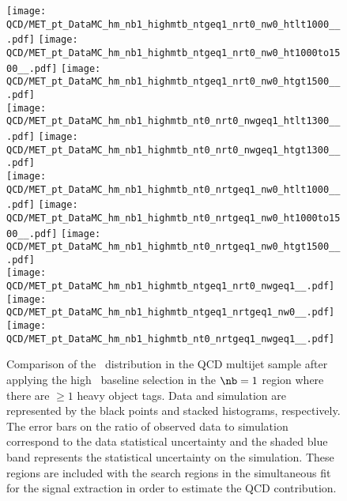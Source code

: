 \begin{figure}[!htb]
	\begin{center}
  \texttt{[image: QCD/MET\_pt\_DataMC\_hm\_nb1\_highmtb\_ntgeq1\_nrt0\_nw0\_htlt1000\_\_.pdf]}
  \texttt{[image: QCD/MET\_pt\_DataMC\_hm\_nb1\_highmtb\_ntgeq1\_nrt0\_nw0\_ht1000to1500\_\_.pdf]}
  \texttt{[image: QCD/MET\_pt\_DataMC\_hm\_nb1\_highmtb\_ntgeq1\_nrt0\_nw0\_htgt1500\_\_.pdf]} \\
  \texttt{[image: QCD/MET\_pt\_DataMC\_hm\_nb1\_highmtb\_nt0\_nrt0\_nwgeq1\_htlt1300\_\_.pdf]} 
  \texttt{[image: QCD/MET\_pt\_DataMC\_hm\_nb1\_highmtb\_nt0\_nrt0\_nwgeq1\_htgt1300\_\_.pdf]} \\
  \texttt{[image: QCD/MET\_pt\_DataMC\_hm\_nb1\_highmtb\_nt0\_nrtgeq1\_nw0\_htlt1000\_\_.pdf]} 
  \texttt{[image: QCD/MET\_pt\_DataMC\_hm\_nb1\_highmtb\_nt0\_nrtgeq1\_nw0\_ht1000to1500\_\_.pdf]} 
  \texttt{[image: QCD/MET\_pt\_DataMC\_hm\_nb1\_highmtb\_nt0\_nrtgeq1\_nw0\_htgt1500\_\_.pdf]} \\
  \texttt{[image: QCD/MET\_pt\_DataMC\_hm\_nb1\_highmtb\_ntgeq1\_nrt0\_nwgeq1\_\_.pdf]} 
  \texttt{[image: QCD/MET\_pt\_DataMC\_hm\_nb1\_highmtb\_ntgeq1\_nrtgeq1\_nw0\_\_.pdf]} 
  \texttt{[image: QCD/MET\_pt\_DataMC\_hm\_nb1\_highmtb\_nt0\_nrtgeq1\_nwgeq1\_\_.pdf]} \\
	\end{center}
	\caption[QCD Multijet HM Control Region $\nb=1$]{Comparison of the \met~distribution in the QCD multijet sample after applying the high \dm~baseline selection in the $\nb=1$ region where there are $\geq1$ heavy object tags. Data and simulation are represented by the black points and stacked histograms, respectively. The error bars on the ratio of observed data to simulation correspond to the data statistical uncertainty and the shaded blue band represents the statistical uncertainty on the simulation. These regions are included with the search regions in the simultaneous fit for the signal extraction in order to estimate the QCD contribution.
	 }
	\label{fig:qcd-cr-datavsmc-hm-nb1}
\end{figure}

